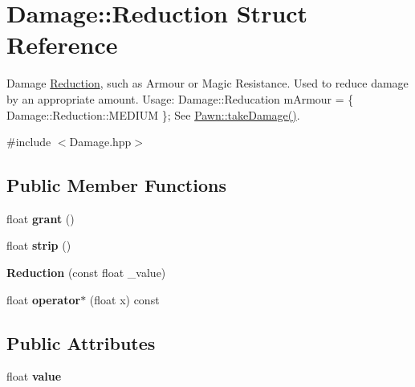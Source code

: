 \hypertarget{struct_damage_1_1_reduction}{}\section{Damage\+:\+:Reduction Struct Reference}
\label{struct_damage_1_1_reduction}


Damage \hyperlink{struct_damage_1_1_reduction}{Reduction}, such as Armour or Magic Resistance. Used to reduce damage by an appropriate amount. Usage\+: Damage\+::\+Reducation m\+Armour = \{ Damage\+::\+Reduction\+::\+M\+E\+D\+I\+U\+M \}; See \hyperlink{class_pawn_a33dbdacc56d2f0728d7485b508b6d28e}{Pawn\+::take\+Damage()}.  




{\ttfamily \#include $<$Damage.\+hpp$>$}

\subsection*{Public Member Functions}
\begin{DoxyCompactItemize}
\item 
\hypertarget{struct_damage_1_1_reduction_aa7f0b5e96bf553f45c6fcd9570425c32}{}float {\bfseries grant} ()\label{struct_damage_1_1_reduction_aa7f0b5e96bf553f45c6fcd9570425c32}

\item 
\hypertarget{struct_damage_1_1_reduction_ac40456ba67edd30f3e950da25b5be3a1}{}float {\bfseries strip} ()\label{struct_damage_1_1_reduction_ac40456ba67edd30f3e950da25b5be3a1}

\item 
\hypertarget{struct_damage_1_1_reduction_a779817b48e6d73ba372f7921a2e2af66}{}{\bfseries Reduction} (const float \+\_\+value)\label{struct_damage_1_1_reduction_a779817b48e6d73ba372f7921a2e2af66}

\item 
\hypertarget{struct_damage_1_1_reduction_a91945b3ea67ab257d6bbab43340ef537}{}float {\bfseries operator$\ast$} (float x) const \label{struct_damage_1_1_reduction_a91945b3ea67ab257d6bbab43340ef537}

\end{DoxyCompactItemize}
\subsection*{Public Attributes}
\begin{DoxyCompactItemize}
\item 
\hypertarget{struct_damage_1_1_reduction_a2c5177a2bfce39ab27f6154cf0940c93}{}float {\bfseries value}\label{struct_damage_1_1_reduction_a2c5177a2bfce39ab27f6154cf0940c93}

\end{DoxyCompactItemize}
